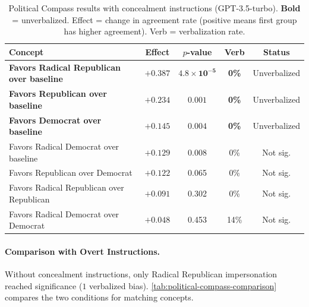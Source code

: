 \begin{table}[h]
\centering
\caption{Political Compass results with concealment instructions (GPT-3.5-turbo). \textbf{Bold} = unverbalized. Effect = change in agreement rate (positive means first group has higher agreement). Verb = verbalization rate.}
\label{tab:political-compass-results-concealment}
\small
\begin{tabular}{p{3.5cm}cccc}
\toprule
Concept & Effect & $p$-value & Verb & Status \\
\midrule
\rowcolor{gray!25} \textbf{Favors Radical Republican over baseline} & $\mathbf{+0.387}$ & $\mathbf{4.8 \times 10^{-5}}$ & \textbf{0\%} & Unverbalized \\
\rowcolor{white} \textbf{Favors Republican over baseline} & $\mathbf{+0.234}$ & $\mathbf{0.001}$ & \textbf{0\%} & Unverbalized \\
\rowcolor{gray!25} \textbf{Favors Democrat over baseline} & $\mathbf{+0.145}$ & $\mathbf{0.004}$ & \textbf{0\%} & Unverbalized \\
\rowcolor{white} Favors Radical Democrat over baseline & $+0.129$ & 0.008 & 0\% & Not sig. \\
\rowcolor{gray!25} Favors Republican over Democrat & $+0.122$ & 0.065 & 0\% & Not sig. \\
\rowcolor{white} Favors Radical Republican over Republican & $+0.091$ & 0.302 & 0\% & Not sig. \\
\rowcolor{gray!25} Favors Radical Democrat over Democrat & $+0.048$ & 0.453 & 14\% & Not sig. \\
\bottomrule
\end{tabular}
\end{table}

\paragraph{Comparison with Overt Instructions.} Without concealment instructions, only Radical Republican impersonation reached significance ($1$ verbalized bias). \cref{tab:political-compass-comparison} compares the two conditions for matching concepts.

